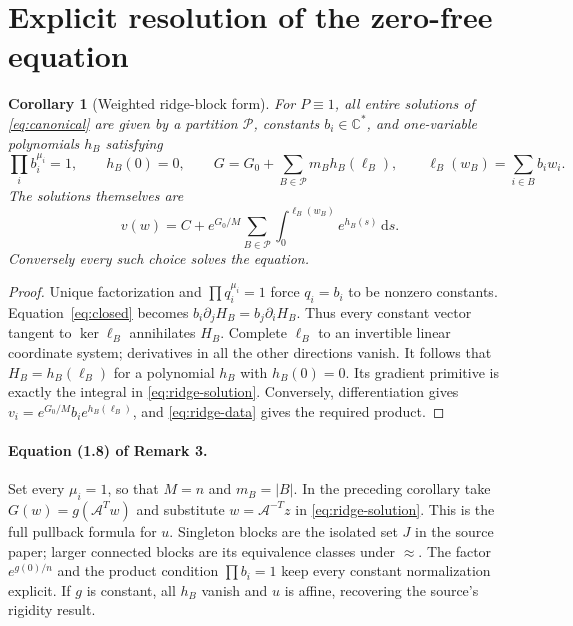 \documentclass[11pt]{article}
\numberwithin{equation}{section}
\newtheorem{corollary}[theorem]{Corollary}
\theoremstyle{definition}\newtheorem{definition}[theorem]{Definition}
\theoremstyle{remark}\newtheorem{remark}[theorem]{Remark}
\newcommand{\C}{\mathbb C}
\newcommand{\dd}{\,\mathrm d}
\newcommand{\Ac}{\mathcal A}
\newcommand{\Pc}{\mathcal P}
\begin{document}
\section{Explicit resolution of the zero-free equation}
\begin{corollary}[Weighted ridge-block form]\label{cor:ridge}
For $P\equiv1$, all entire solutions of \eqref{eq:canonical} are given by
a partition $\Pc$, constants $b_i\in\C^*$, and one-variable polynomials
$h_B$ satisfying
\begin{equation}\label{eq:ridge-data}
 \prod_i b_i^{\mu_i}=1,\qquad h_B(0)=0,\qquad
 G=G_0+\sum_{B\in\Pc}m_B h_B(\ell_B),\qquad
 \ell_B(w_B)=\sum_{i\in B}b_iw_i.
\end{equation}
The solutions themselves are
\begin{equation}\label{eq:ridge-solution}
 v(w)=C+e^{G_0/M}\sum_{B\in\Pc}
          \int_0^{\ell_B(w_B)}e^{h_B(s)}\dd s.
\end{equation}
Conversely every such choice solves the equation.
\end{corollary}
\begin{proof}
Unique factorization and $\prod q_i^{\mu_i}=1$ force $q_i=b_i$ to be
nonzero constants. Equation~\eqref{eq:closed} becomes
$b_i\partial_jH_B=b_j\partial_iH_B$. Thus every constant vector tangent
to $\ker\ell_B$ annihilates $H_B$. Complete $\ell_B$ to an invertible
linear coordinate system; derivatives in all the other directions vanish.
It follows that $H_B=h_B(\ell_B)$ for a polynomial $h_B$ with $h_B(0)=0$.
Its gradient primitive is exactly the integral in
\eqref{eq:ridge-solution}. Conversely, differentiation gives
$v_i=e^{G_0/M}b_i e^{h_B(\ell_B)}$, and \eqref{eq:ridge-data} gives the
required product.
\end{proof}

\paragraph{Equation (1.8) of Remark 3.}
Set every $\mu_i=1$, so that $M=n$ and $m_B=|B|$. In the preceding
corollary take $G(w)=g(\Ac^Tw)$ and substitute $w=\Ac^{-T}z$ in
\eqref{eq:ridge-solution}. This is the full pullback formula for $u$.
Singleton blocks are the isolated set $J$ in the source paper; larger
connected blocks are its equivalence classes under $\approx$. The factor
$e^{g(0)/n}$ and the product condition $\prod b_i=1$ keep every constant
normalization explicit. If $g$ is constant, all $h_B$ vanish and $u$ is
affine, recovering the source's rigidity result.
\end{document}
